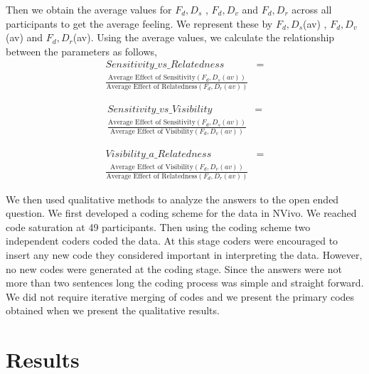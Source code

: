 \documentclass[conference]{IEEEtran}
\begin{document}
Then we obtain the average values for $F_d,D_s$ , $F_d,D_v$ and $F_d,D_r$ across all participants to get the average feeling. We represent these by $F_d,D_s$(av) , $F_d,D_v$(av) and $F_d,D_r$(av). Using the average values, we calculate the relationship between the parameters as follows,
 \begin{equation} \label{eq1}
\begin{split}
Sensitivity\_vs\_Relatedness & = \\ \frac{\text{Average Effect of Sensitivity}(F_{d},D_{s}(av)) }{\text{Average Effect of Relatedness}(F_{d},D_{r}(av))} 
\end{split}
\end{equation}

 \begin{equation} \label{eq1}
\begin{split}
Sensitivity\_vs\_Visibility & = \\ \frac{\text{Average Effect of Sensitivity}(F_{d},D_{s}(av))}{\text{Average Effect of Visibility}(F_{d},D_{v}(av)) } 
\end{split}
\end{equation}

 \begin{equation} \label{eq1}
\begin{split}
Visibility\_a\_Relatedness & = \\ \frac{\text{Average Effect of Visibility}(F_{d},D_{v}(av)) }{\text{Average Effect of Relatedness}(F_{d},D_{r}(av))} 
\end{split}
\end{equation}

We then used qualitative methods to analyze the answers to the open ended question. We first developed a coding scheme for the data in NVivo. We reached code saturation at 49 participants. Then using the coding scheme two independent coders coded the data. At this stage coders were encouraged to insert any new code they considered important in interpreting the data. However, no new codes were generated at the coding stage. Since the answers were not more than two sentences long the coding process was simple and straight forward. We did not require iterative merging of codes and we present the primary codes obtained when we present the qualitative results.

\section {Results}
\end{document}
